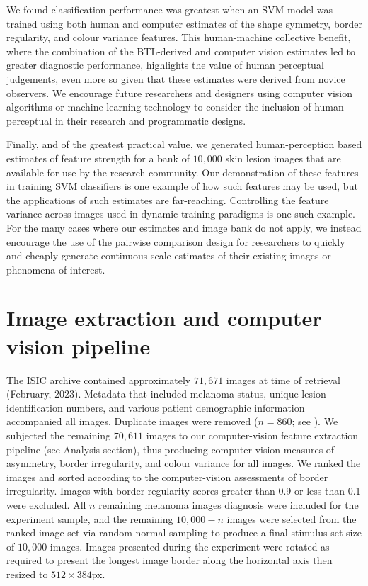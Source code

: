 \documentclass[
    man, 12pt, a4paper,
    donotrepeattitle, floatsintext, draftfirst
]{apa7}
\begin{document}
We found classification performance was greatest when an SVM model was trained using both human and computer estimates of the shape symmetry, border regularity, and colour variance features. This human-machine collective benefit, where the combination of the BTL-derived and computer vision estimates led to greater diagnostic performance, highlights the value of human perceptual judgements, even more so given that these estimates were derived from novice observers. We encourage future researchers and designers using computer vision algorithms or machine learning technology to consider the inclusion of human perceptual in their research and programmatic designs.

Finally, and of the greatest practical value, we generated human-perception based estimates of feature strength for a bank of $10,000$ skin lesion images that are available for use by the research community. Our demonstration of these features in training SVM classifiers is one example of how such features may be used, but the applications of such estimates are far-reaching. Controlling the feature variance across images used in dynamic training paradigms is one such example. For the many cases where our estimates and image bank do not apply, we instead encourage the use of the pairwise comparison design for researchers to quickly and cheaply generate continuous scale estimates of their existing images or phenomena of interest.


\newpage
\printbibliography

\newpage
\appendix
\section{Image extraction and computer vision pipeline}
\label{appendix:cvpipe}
The ISIC archive contained approximately $71, 671$ images at time of retrieval (February, 2023). Metadata that included melanoma status, unique lesion identification numbers, and various patient demographic information accompanied all images. Duplicate images were removed ($n = 860$; see \textcite{cassidy2022analysis}). We subjected the remaining $70, 611$ images to our computer-vision feature extraction pipeline (see Analysis section), thus producing computer-vision measures of asymmetry, border irregularity, and colour variance for all images. We ranked the images and sorted according to the computer-vision assessments of border irregularity. Images with border regularity scores greater than 0.9 or less than 0.1 were excluded. All $n$ remaining melanoma images diagnosis were included for the experiment sample, and the remaining $10,000 - n$ images were selected from the ranked image set via random-normal sampling to produce a final stimulus set size of $10, 000$ images. Images presented during the experiment were rotated as required to present the longest image border along the horizontal axis then resized to $512\times384$px.
\end{document}
